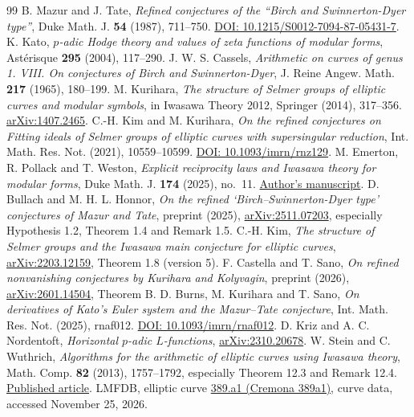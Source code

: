 \documentclass[11pt]{article}
\theoremstyle{remark}\newtheorem{remark}[theorem]{Remark}
\begin{document}
\begin{thebibliography}{99}
 B. Mazur and J. Tate, \emph{Refined conjectures of the ``Birch and Swinnerton-Dyer type''}, Duke Math. J. \textbf{54} (1987), 711--750. \href{https://doi.org/10.1215/S0012-7094-87-05431-7}{DOI: 10.1215/S0012-7094-87-05431-7}.
 K. Kato, \emph{$p$-adic Hodge theory and values of zeta functions of modular forms}, Ast\'erisque \textbf{295} (2004), 117--290.
 J. W. S. Cassels, \emph{Arithmetic on curves of genus 1. VIII. On conjectures of Birch and Swinnerton-Dyer}, J. Reine Angew. Math. \textbf{217} (1965), 180--199.
 M. Kurihara, \emph{The structure of Selmer groups of elliptic curves and modular symbols}, in Iwasawa Theory 2012, Springer (2014), 317--356. \href{https://arxiv.org/abs/1407.2465}{arXiv:1407.2465}.
 C.-H. Kim and M. Kurihara, \emph{On the refined conjectures on Fitting ideals of Selmer groups of elliptic curves with supersingular reduction}, Int. Math. Res. Not. (2021), 10559--10599. \href{https://doi.org/10.1093/imrn/rnz129}{DOI: 10.1093/imrn/rnz129}.
 M. Emerton, R. Pollack and T. Weston, \emph{Explicit reciprocity laws and Iwasawa theory for modular forms}, Duke Math. J. \textbf{174} (2025), no.~11. \href{https://math.bu.edu/people/rpollack/Papers/EPW2.pdf}{Author's manuscript}.
 D. Bullach and M. H. L. Honnor, \emph{On the refined `Birch--Swinnerton-Dyer type' conjectures of Mazur and Tate}, preprint (2025), \href{https://arxiv.org/abs/2511.07203}{arXiv:2511.07203}, especially Hypothesis 1.2, Theorem 1.4 and Remark 1.5.
 C.-H. Kim, \emph{The structure of Selmer groups and the Iwasawa main conjecture for elliptic curves}, \href{https://arxiv.org/abs/2203.12159}{arXiv:2203.12159}, Theorem 1.8 (version 5).
 F. Castella and T. Sano, \emph{On refined nonvanishing conjectures by Kurihara and Kolyvagin}, preprint (2026), \href{https://arxiv.org/abs/2601.14504}{arXiv:2601.14504}, Theorem B.
 D. Burns, M. Kurihara and T. Sano, \emph{On derivatives of Kato's Euler system and the Mazur--Tate conjecture}, Int. Math. Res. Not. (2025), rnaf012. \href{https://doi.org/10.1093/imrn/rnaf012}{DOI: 10.1093/imrn/rnaf012}.
 D. Kriz and A. C. Nordentoft, \emph{Horizontal $p$-adic $L$-functions}, \href{https://arxiv.org/abs/2310.20678}{arXiv:2310.20678}.
 W. Stein and C. Wuthrich, \emph{Algorithms for the arithmetic of elliptic curves using Iwasawa theory}, Math. Comp. \textbf{82} (2013), 1757--1792, especially Theorem 12.3 and Remark 12.4. \href{https://wstein.org/papers/mcom2649-iwasawa-alg.pdf}{Published article}.
 LMFDB, elliptic curve \href{https://www.lmfdb.org/EllipticCurve/Q/389a1/}{389.a1 (Cremona 389a1)}, curve data, accessed November 25, 2026.
\end{thebibliography}
\end{document}
